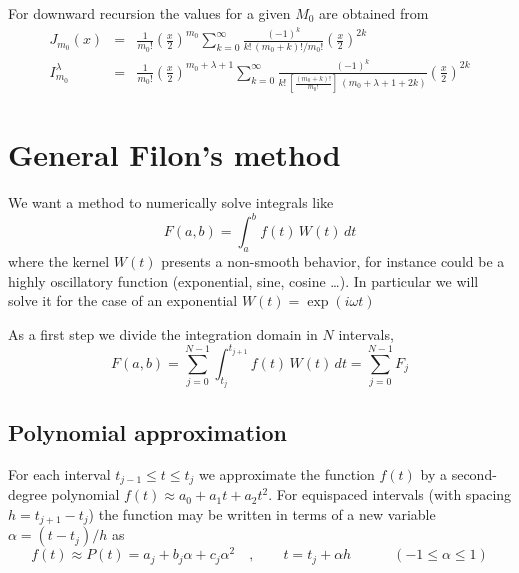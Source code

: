 For downward recursion the values for a given $M_{0}$ are obtained from
\begin{eqnarray}\label{Q:Sum}
J_{m_{0}}(x) &=& \frac{1}{m_{0}!} \left( \frac{x}{2} \right)^{m_{0}}
\sum_{k=0}^{\infty} \frac{(-1)^{k}}{k!\, (m_{0}+k)!/m_{0}!} \left(
\frac{x}{2} \right)^{2k} \\
I^{\lambda}_{m_{0}} &=& \frac{1}{m_{0}!} \left( \frac{x}{2}
\right)^{m_{0}+ \lambda + 1} \sum_{k=0}^{\infty} \frac{(-1)^{k}}{k!\,
\left[ \frac{(m_{0}+k)!}{m_{0}!} \right] \, (m_{0}+ \lambda + 1 + 2k)}
\left( \frac{x}{2} \right)^{2k}
\end{eqnarray}

\section{General Filon's method}
\label{S:gener-filons-meth}

We want a method to numerically solve integrals like
\begin{equation}
  \label{Q:integral-filon-general}
  F(a,b)= \int_{a}^{b} f(t) \, W(t)\, dt
\end{equation}
where the kernel $W(t)$ presents a non-smooth behavior, for instance could be a highly oscillatory function (exponential, sine, cosine \dots). In particular we will solve it for the case of an exponential $W(t)= \exp{(i \omega t)}$

As a first step we divide the integration domain in $N$ intervals, 
\begin{equation}
\label{Q:f-sum_j}
  F(a,b)= \sum_{j=0}^{N-1} \int_{t_{j}}^{t_{j+1}} f(t) \, W(t)\, dt = \sum_{j=0}^{N-1} F_{j}
\end{equation}

\subsection{Polynomial approximation}
\label{S:polyn-appr}

For each interval $t_{j-1} \le t \le t_{j}$ we approximate the function $f(t)$ by a second-degree polynomial $f(t)\approx a_{0} + a_{1}t + a_{2}t^{2}$. For equispaced intervals (with spacing $h=t_{j+1}-t_{j}$) the function may be written in terms of a new variable $\alpha = (t-t_{j})/h$ as
\begin{equation}
  \label{Q:gfm-polyn-approx}
  f(t) \approx P(t)= a_{j} + b_{j} \alpha + c_{j} \alpha^{2} \quad , \qquad t= t_{j}+\alpha h \quad \qquad (-1  \le \alpha \le 1)
\end{equation}

